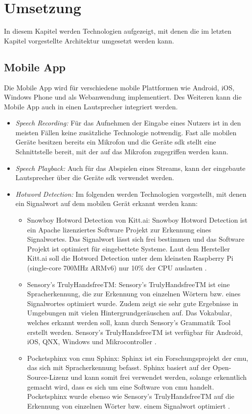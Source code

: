 \section{Umsetzung}\label{sec:umsetzung}
In diesem Kapitel werden Technologien aufgezeigt, mit denen die im letzten Kapitel vorgestellte Architektur umgesetzt werden kann. 

\subsection{Mobile App}
Die Mobile App wird für verschiedene mobile Plattformen wie Android, iOS, Windows Phone und als Webanwendung implementiert. Des Weiteren kann die Mobile App auch in einen Lautsprecher integriert werden. 
\begin{itemize}
	\item \textsl{Speech Recording:} Für das Aufnehmen der Eingabe eines Nutzers ist in den meisten Fällen keine zusätzliche Technologie notwendig. Fast alle mobilen Geräte besitzen bereits ein Mikrofon und die Geräte \acs{sdk} stellt eine Schnittstelle bereit, mit der auf das Mikrofon zugegriffen werden kann.
	\item \textsl{Speech Playback:} Auch für das Abspielen eines Streams, kann der eingebaute Lautsprecher über die Geräte \acs{sdk} verwendet werden.
	\item \textsl{Hotword Detection:} Im folgenden werden Technologien vorgestellt, mit denen ein Signalwort auf dem mobilen Gerät erkannt werden kann: 
	\begin{itemize}
		\item Snowboy Hotword Detection von Kitt.ai: Snowboy Hotword Detection ist ein Apache lizenziertes Software Projekt zur Erkennung eines Signalwortes. Das Signalwort lässt sich frei bestimmen und das Software Projekt ist optimiert für eingebettete Systeme. Laut dem Hersteller Kitt.ai soll die Hotword Detection unter dem kleinsten Raspberry Pi (single-core 700MHz ARMv6) nur 10\% der CPU
		auslasten \cite{SnowboyHotwordDetection}.
		\item Sensory's TrulyHandsfreeTM: Sensory's TrulyHandsfreeTM ist eine Spracherkennung, die zur Erkennung von einzelnen Wörtern bzw. eines Signalwortes optimiert wurde. Zudem zeigt sie sehr gute Ergebnisse in Umgebungen mit vielen Hintergrundgeräuschen auf. Das Vokabular, welches erkannt werden soll, kann durch Sensory's Grammatik Tool erstellt werden. Sensory's TrulyHandsfreeTM ist verfügbar für Android, iOS, QNX, Windows und Mikrocontroller \cite{TrulyHandsfreeTM}.
		\item Pocketsphinx von \acs{cmu} Sphinx: Sphinx ist ein Forschungsprojekt der \ac{cmu}, das sich mit Spracherkennung befasst. Sphinx basiert auf der Open-Source-Lizenz und kann somit frei verwendet werden, solange erkenntlich gemacht wird, dass es sich um eine Software von \ac{cmu} handelt. Pocketsphinx wurde ebenso wie Sensory's TrulyHandsfreeTM auf die Erkennung von einzelnen Wörter bzw. einem Signalwort optimiert \cite{Pocketsphinx}.
	\end{itemize}
\end{itemize}

